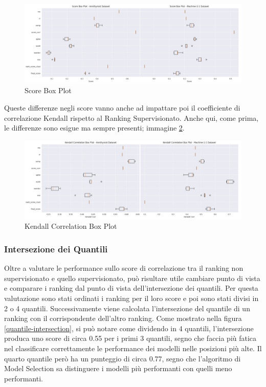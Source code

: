 \begin{figure}[t]
	\centering
	\includegraphics[width=15cm, scale=1]{images/score_box}
	\caption{Score Box Plot}
	\label{score-box}
	
\end{figure}

Queste differenze negli score vanno anche ad impattare poi il coefficiente di correlazione Kendall rispetto al Ranking Supervisionato. Anche qui, come prima, le differenze sono esigue ma sempre presenti; immagine \ref{kendall-box}.

\begin{figure}[t]
	\centering
	\includegraphics[width=15cm, scale=1]{images/kendall_box}
	\caption{Kendall Correlation Box Plot}
	\label{kendall-box}
		
\end{figure}


\subsubsection{Intersezione dei Quantili}
Oltre a valutare le performance sullo score di correlazione tra il ranking non supervisionato e quello supervisionato, può risultare utile cambiare punto di vista e comparare i ranking dal punto di vista dell'intersezione dei quantili.
Per questa valutazione sono stati ordinati i ranking per il loro score e poi sono stati divisi in 2 o 4 quantili. Successivamente viene calcolata l'intersezione del quantile di un ranking con il corrispondente dell'altro ranking.
Come mostrato nella figura \ref{quantile-intersection}, si può notare come dividendo in 4 quantili, l'intersezione produca uno score di circa 0.55 per i primi 3 quantili, segno che faccia più fatica nel classificare correttamente le performance dei modelli nelle posizioni più alte. Il quarto quantile però ha un punteggio di circa 0.77, segno che l'algoritmo di Model Selection sa distinguere i modelli più performanti con quelli meno performanti.


